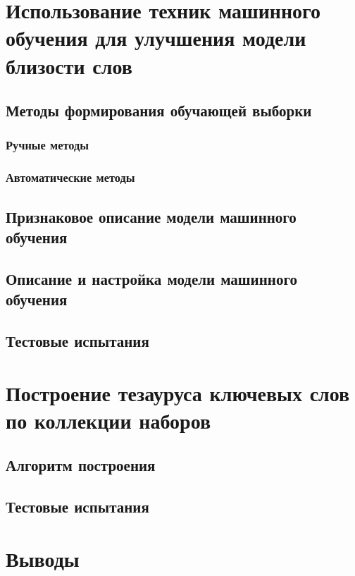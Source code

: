 \section{Использование техник машинного обучения для улучшения модели близости слов}
\subsection{Методы формирования обучающей выборки}
\subsubsection{Ручные методы}
\subsubsection{Автоматические методы}
\subsection{Признаковое описание модели машинного обучения}
\subsection{Описание и настройка модели машинного обучения}
\subsection{Тестовые испытания}
\section{Построение тезауруса ключевых слов по коллекции наборов}
\subsection{Алгоритм построения}
\subsection{Тестовые испытания}
\section{Выводы}
